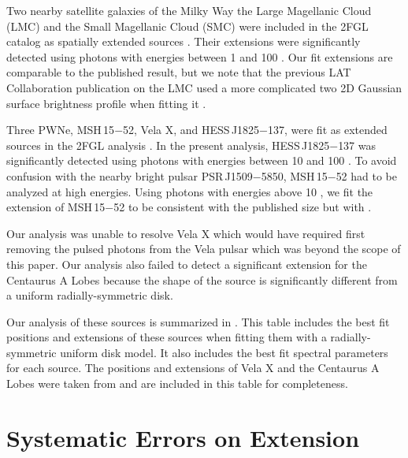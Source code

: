 Two nearby satellite galaxies of the Milky Way the Large Magellanic Cloud (LMC)
and the Small Magellanic
Cloud (SMC) were included in the 2FGL catalog as spatially extended sources \citep{abdo_2010a_observations-large,abdo_2010a_detection-small}.  
Their extensions were significantly
detected using photons with energies between
1 \gev and 100 \gev. Our
fit extensions are comparable to the published result, but we note that
the previous LAT Collaboration publication on the LMC used a more complicated two 2D Gaussian surface
brightness profile when fitting it \citep{abdo_2010a_observations-large}.

Three PWNe, MSH\,15$-$52, Vela X, and HESS\,J1825$-$137, were fit as
extended sources in the 2FGL analysis \citep{abdo_2010a_detection-energetic,abdo_2010c_fermi-large,grondin_2011_detection-pulsar}.  
In the present analysis, HESS\,J1825$-$137
was significantly detected using photons with energies between 10
\gev and 100 \gev.  To avoid confusion with the nearby bright pulsar
PSR\,J1509$-$5850, MSH\,15$-$52 had to be analyzed at high energies.
Using photons with energies above 10 \gev, we fit the extension of
MSH\,15$-$52 to be consistent with the published size but with .

Our analysis was unable to resolve Vela X which would have required first
removing the pulsed photons from the Vela pulsar which was beyond the
scope of this paper.  Our analysis also failed to detect a significant
extension for the Centaurus A Lobes because
the shape of the source is significantly different from a uniform
radially-symmetric disk\citep{abdo_2010a_fermi-gamma-ray}.



Our analysis of these sources is summarized in
.  This table includes the best fit
positions and extensions of these sources when fitting them 
with a radially-symmetric uniform disk model. It also
includes the best fit spectral parameters for each source.  The positions
and extensions of Vela X and the Centaurus A Lobes were taken from
\cite{abdo_2010c_fermi-large,abdo_2010a_fermi-gamma-ray} and are included in this table for completeness.

\section{Systematic Errors on Extension}

